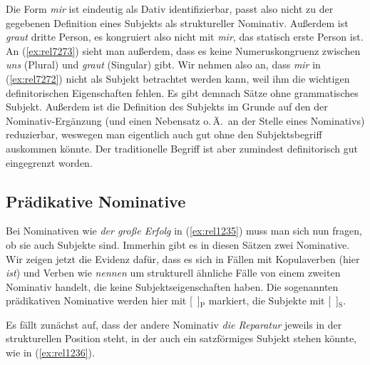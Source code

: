 Die Form \textit{mir} ist eindeutig als Dativ identifizierbar, passt also nicht zu der gegebenen Definition eines Subjekts als struktureller Nominativ.
Außerdem ist \textit{graut} dritte Person, es kongruiert also nicht mit \textit{mir}, das statisch erste Person ist.
An (\ref{ex:rel7273}) sieht man außerdem, dass es keine Numeruskongruenz zwischen \textit{uns} (Plural) und 
\textit{graut} (Singular) gibt.
Wir nehmen also an, dass \textit{mir} in (\ref{ex:rel7272}) nicht als Subjekt betrachtet werden kann, weil ihm die wichtigen definitorischen Eigenschaften fehlen.
Es gibt demnach Sätze ohne grammatisches Subjekt.
Außerdem ist die Definition des Subjekts im Grunde auf den der Nominativ-Ergänzung (und einen Nebensatz o.\,Ä.\ an der Stelle eines Nominativs) reduzierbar, weswegen man eigentlich auch gut ohne den Subjektsbegriff auskommen könnte.
Der traditionelle Begriff ist aber zumindest definitorisch gut eingegrenzt worden.

\subsection[Prädikative Nominative]{\Opsional Prädikative Nominative}

\label{sec:praednom}

Bei Nominativen wie \textit{der große Erfolg} in (\ref{ex:rel1235}) muss man sich nun fragen, ob sie auch Subjekte sind.
Immerhin gibt es in diesen Sätzen zwei Nominative.
Wir zeigen jetzt die Evidenz dafür, dass es sich in Fällen mit Kopulaverben (hier \textit{ist}) und Verben wie \textit{nennen} um strukturell ähnliche Fälle von einem zweiten Nominativ handelt, die keine Subjektseigenschaften haben.
Die sogenannten prädikativen Nominative werden hier mit [~]$_\textrm{P}$ markiert, die Subjekte mit [~]$_\textrm{S}$.

\begin{exe}
  \ex\label{ex:rel1235}
  \begin{xlist}
  \end{xlist}
\end{exe}

Es fällt zunächst auf, dass der andere Nominativ \textit{die Reparatur} jeweils in der strukturellen Position steht, in der auch ein satzförmiges Subjekt stehen könnte, wie in (\ref{ex:rel1236}).

\begin{exe}
  \ex\label{ex:rel1236}
  \begin{xlist}
  \end{xlist}
\end{exe}


